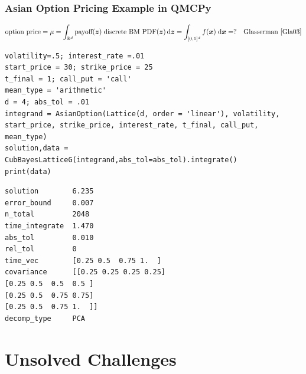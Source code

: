 \documentclass[11pt,compress,xcolor={usenames,dvipsnames},aspectratio=169]{beamer}
\begin{document}
\begin{frame}[fragile]\frametitle{Asian Option Pricing Example in QMCPy}
	\vspace{-5ex}
	\[
	\text{option price} = \mu = \int_{\mathbb{R}^d} \text{payoff}(\boldsymbol{z}) \; \text{discrete BM PDF}(\boldsymbol{z})   \, {\rm d} \boldsymbol{z} = \int_{[0,1]^d} f(\boldsymbol{x}) \; {\rm d} \boldsymbol{x}  = ? \quad \text{Glasserman  \cite{Gla03}}
	\]
\noindent\begin{minipage}{0.52\textwidth}
\begin{lstlisting}[style=Python]
volatility=.5; interest_rate =.01
start_price = 30; strike_price = 25
t_final = 1; call_put = 'call'
mean_type = 'arithmetic'
d = 4; abs_tol = .01
integrand = AsianOption(Lattice(d, order = 'linear'), volatility, start_price, strike_price, interest_rate, t_final, call_put, mean_type)
solution,data = CubBayesLatticeG(integrand,abs_tol=abs_tol).integrate()
print(data)
\end{lstlisting}
\end{minipage} 
\qquad
\begin{minipage}{0.42\textwidth}
\begin{lstlisting}[style=Python]
solution        6.235
error_bound     0.007
n_total         2048
time_integrate  1.470
abs_tol         0.010
rel_tol         0
time_vec        [0.25 0.5  0.75 1.  ]
covariance      [[0.25 0.25 0.25 0.25]
[0.25 0.5  0.5  0.5 ]
[0.25 0.5  0.75 0.75]
[0.25 0.5  0.75 1.  ]]
decomp_type     PCA
\end{lstlisting}
\end{minipage} 
	
\end{frame}


\section{Unsolved Challenges}
\end{document}
